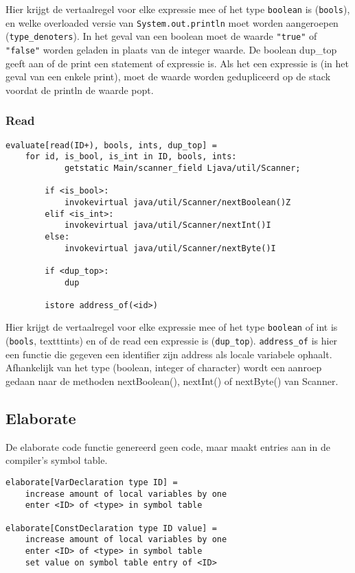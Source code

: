 \documentclass[]{article}
\begin{document}
Hier krijgt de vertaalregel voor elke expressie mee of het type \texttt{boolean} is (\texttt{bools}), en welke overloaded versie van \texttt{System.out.println} moet worden aangeroepen (\texttt{type\_denoters}). In het geval van een boolean moet de waarde \texttt{"true"} of \texttt{"false"} worden geladen in plaats van de integer waarde. De boolean dup\_top geeft aan of de print een statement of expressie is. Als het een expressie is (in het geval van een enkele print), moet de waarde worden gedupliceerd op de stack voordat de println de waarde popt.

\subsubsection{Read}
\begin{verbatim}
evaluate[read(ID+), bools, ints, dup_top] =
    for id, is_bool, is_int in ID, bools, ints:
		    getstatic Main/scanner_field Ljava/util/Scanner;
		
        if <is_bool>:
            invokevirtual java/util/Scanner/nextBoolean()Z
        elif <is_int>:
            invokevirtual java/util/Scanner/nextInt()I
        else:
            invokevirtual java/util/Scanner/nextByte()I		
				
        if <dup_top>:
            dup		
		
        istore address_of(<id>)
\end{verbatim}

Hier krijgt de vertaalregel voor elke expressie mee of het type \texttt{boolean} of int is (\texttt{bools}, texttt{ints}) en of de read een expressie is (\texttt{dup\_top}). \texttt{address\_of} is hier een functie die gegeven een identifier zijn address als locale variabele ophaalt. Afhankelijk van het type (boolean, integer of character) wordt een aanroep gedaan naar de methoden nextBoolean(), nextInt() of nextByte() van Scanner.

\subsection{Elaborate}
De elaborate code functie genereerd geen code, maar maakt entries aan in de compiler's symbol table.

\begin{verbatim}
elaborate[VarDeclaration type ID] =
    increase amount of local variables by one
    enter <ID> of <type> in symbol table

elaborate[ConstDeclaration type ID value] =
    increase amount of local variables by one
    enter <ID> of <type> in symbol table
    set value on symbol table entry of <ID>
\end{verbatim}
\end{document}
